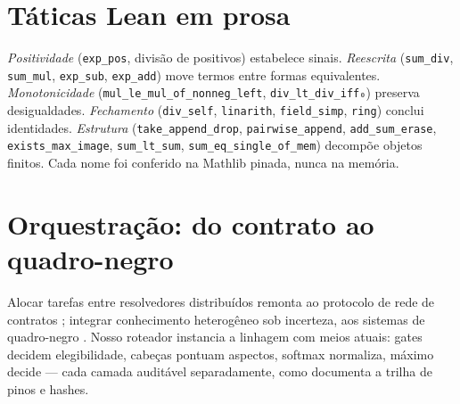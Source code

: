 \section{Táticas Lean em prosa}
\textit{Positividade} (\texttt{exp\_pos}, divisão de positivos) estabelece sinais. \textit{Reescrita} (\texttt{sum\_div}, \texttt{sum\_mul}, \texttt{exp\_sub}, \texttt{exp\_add}) move termos entre formas equivalentes. \textit{Monotonicidade} (\nolinkurl{mul_le_mul_of_nonneg_left}, \texttt{div\_lt\_div\_iff₀}) preserva desigualdades. \textit{Fechamento} (\texttt{div\_self}, \texttt{linarith}, \texttt{field\_simp}, \texttt{ring}) conclui identidades. \textit{Estrutura} (\texttt{take\_append\_drop}, \texttt{pairwise\_append}, \texttt{add\_sum\_erase}, \texttt{exists\_max\_image}, \texttt{sum\_lt\_sum}, \texttt{sum\_eq\_single\_of\_mem}) decompõe objetos finitos. Cada nome foi conferido na Mathlib pinada, nunca na memória.
\section{Orquestração: do contrato ao quadro-negro}
Alocar tarefas entre resolvedores distribuídos remonta ao protocolo de rede de contratos \cite{smith1980}; integrar conhecimento heterogêneo sob incerteza, aos sistemas de quadro-negro \cite{erman1980}. Nosso roteador instancia a linhagem com meios atuais: gates decidem elegibilidade, cabeças pontuam aspectos, softmax normaliza, máximo decide --- cada camada auditável separadamente, como documenta a trilha de pinos e hashes.
